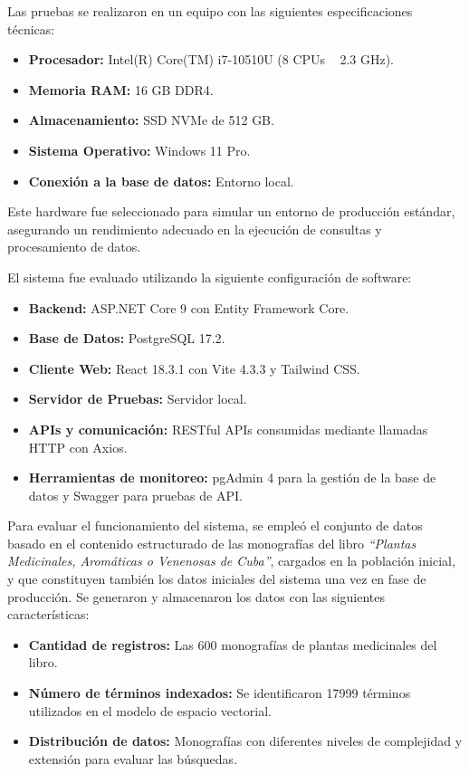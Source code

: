 Las pruebas se realizaron en un equipo con las siguientes especificaciones técnicas:

\begin{itemize}
    \item \textbf{Procesador:} Intel(R) Core(TM) i7-10510U (8 CPUs ~ 2.3 GHz).
    \item \textbf{Memoria RAM:} 16 GB DDR4.
    \item \textbf{Almacenamiento:} SSD NVMe de 512 GB.
    \item \textbf{Sistema Operativo:} Windows 11 Pro.
    \item \textbf{Conexión a la base de datos:} Entorno local.
\end{itemize}

Este hardware fue seleccionado para simular un entorno de producción estándar, asegurando un rendimiento 
adecuado en la ejecución de consultas y procesamiento de datos.

El sistema fue evaluado utilizando la siguiente configuración de software:

\begin{itemize}
    \item \textbf{Backend:} ASP.NET Core 9 con Entity Framework Core.
    \item \textbf{Base de Datos:} PostgreSQL 17.2.
    \item \textbf{Cliente Web:} React 18.3.1 con Vite 4.3.3 y Tailwind CSS.
    \item \textbf{Servidor de Pruebas:} Servidor local.
    \item \textbf{APIs y comunicación:} RESTful APIs consumidas mediante llamadas HTTP con Axios.
    \item \textbf{Herramientas de monitoreo:} pgAdmin 4 para la gestión de la base de datos y Swagger para pruebas de API.
\end{itemize}

Para evaluar el funcionamiento del sistema, se empleó el conjunto de datos basado en el contenido estructurado 
de las monografías del libro \textit{``Plantas Medicinales, Aromáticas o Venenosas de Cuba''}, cargados en la población inicial, 
y que constituyen también los datos iniciales del sistema una vez en fase de producción. Se generaron y 
almacenaron los datos con las siguientes características:

\begin{itemize}
    \item \textbf{Cantidad de registros:} Las 600 monografías de plantas medicinales del libro.
    \item \textbf{Número de términos indexados:} Se identificaron 17999 términos utilizados en el modelo de espacio vectorial.
    \item \textbf{Distribución de datos:} Monografías con diferentes niveles de complejidad y extensión para evaluar las búsquedas.
\end{itemize}





